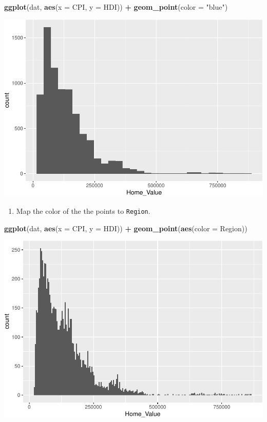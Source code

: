 \documentclass[
]{book}
\newenvironment{Shaded}{\begin{snugshade}}{\end{snugshade}}
\newcommand{\DataTypeTok}[1]{\textcolor[rgb]{0.13,0.29,0.53}{#1}}
\newcommand{\KeywordTok}[1]{\textcolor[rgb]{0.13,0.29,0.53}{\textbf{#1}}}
\newcommand{\NormalTok}[1]{#1}
\newcommand{\OperatorTok}[1]{\textcolor[rgb]{0.81,0.36,0.00}{\textbf{#1}}}
\newcommand{\StringTok}[1]{\textcolor[rgb]{0.31,0.60,0.02}{#1}}
\providecommand{\tightlist}{%
  \setlength{\itemsep}{0pt}\setlength{\parskip}{0pt}}
\begin{document}
\begin{alert}
\begin{Shaded}
\begin{Highlighting}[]
\KeywordTok{ggplot}\NormalTok{(dat, }\KeywordTok{aes}\NormalTok{(}\DataTypeTok{x =}\NormalTok{ CPI, }\DataTypeTok{y =}\NormalTok{ HDI)) }\OperatorTok{+}
\StringTok{  }\KeywordTok{geom\_point}\NormalTok{(}\DataTypeTok{color =} \StringTok{"blue"}\NormalTok{)}
\end{Highlighting}
\end{Shaded}

\includegraphics{R/Rgraphics/figures/unnamed-chunk-160-1.pdf}

\begin{enumerate}
\def\labelenumi{\arabic{enumi}.}
\setcounter{enumi}{2}
\tightlist
\item
  Map the color of the the points to \texttt{Region}.
\end{enumerate}

\begin{Shaded}
\begin{Highlighting}[]
\KeywordTok{ggplot}\NormalTok{(dat, }\KeywordTok{aes}\NormalTok{(}\DataTypeTok{x =}\NormalTok{ CPI, }\DataTypeTok{y =}\NormalTok{ HDI)) }\OperatorTok{+}
\StringTok{  }\KeywordTok{geom\_point}\NormalTok{(}\KeywordTok{aes}\NormalTok{(}\DataTypeTok{color =}\NormalTok{ Region))}
\end{Highlighting}
\end{Shaded}

\includegraphics{R/Rgraphics/figures/unnamed-chunk-161-1.pdf}


\end{alert}
\end{document}
